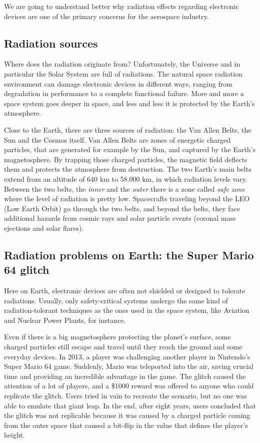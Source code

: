 We are going to understand better why radiation effects regarding electronic devices are one of the primary concerns for the aerospace industry.\bigskip

\subsection{Radiation sources}
Where does the radiation originate from? Unfortunately, the Universe and in particular the Solar System are full of radiations. The natural space radiation environment can damage electronic devices in different ways, ranging from degradation in performance to a complete functional failure. More and more a space system goes deeper in space, and less and less it is protected by the Earth's atmosphere.\bigskip

Close to the Earth, there are three sources of radiation: the Van Allen Belts, the Sun and the Cosmos itself. Van Allen Belts are zones of energetic charged particles, that are generated for example by the Sun, and captured by the Earth's magnetosphere. By trapping those charged particles, the magnetic field deflects them and protects the atmosphere from destruction. The two Earth's main belts extend from an altitude of 640 km to 58.000 km, in which radiation levels vary. Between the two belts, the \textit{inner} and the \textit{outer} there is a zone called \textit{safe zone} where the level of radiation is pretty low. Spacecrafts traveling beyond the LEO (Low Earth Orbit) go through the two belts, and beyond the belts, they face additional hazards from cosmic rays and solar particle events (coronal mass ejections and solar flares).


\subsection{Radiation problems on Earth: the Super Mario 64 glitch}

Here on Earth, electronic devices are often not shielded or designed to tolerate radiations. Usually, only safety-critical systems undergo the same kind of radiation-tolerant techniques as the ones used in the space system, like Aviation and Nuclear Power Plants, for instance.\bigskip

Even if there is a big magnetosphere protecting the planet's surface, some charged particles still escape and travel until they reach the ground and some everyday devices. In 2013, a player was challenging another player in Nintendo's Super Mario 64 game. Suddenly, Mario was teleported into the air, saving crucial time and providing an incredible advantage in the game. The glitch caused the attention of a lot of players, and a \$1000 reward was offered to anyone who could replicate the glitch. Users tried in vain to recreate the scenario, but no one was able to emulate that giant leap. In the end, after eight years, users concluded that the glitch was not replicable because it was caused by a charged particle coming from the outer space that caused a bit-flip in the value that defines the player's height. \bigskip

